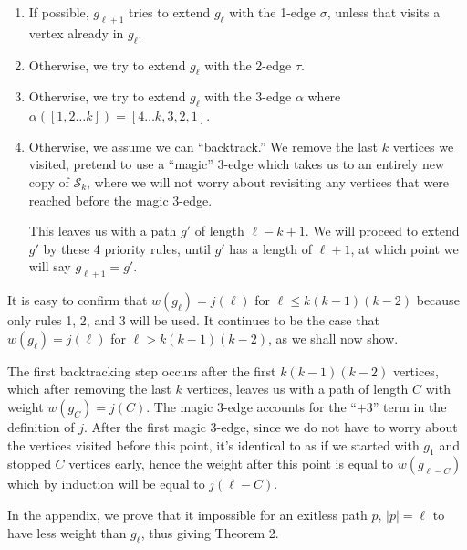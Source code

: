 \documentclass{article}
\newcommand{\hide}[1]{}
\newcommand{\edit}[1]{}%
\newcommand{\dc}[1]{}%
\begin{document}
\begin{enumerate}
    \item If possible, $g_{\ell+1}$ tries to extend $g_\ell$ with the 1-edge $\sigma$\dc{$\sigma$ of something, since $\sigma$ is a function}, unless that visits a vertex already in $g_\ell$.
    \item Otherwise, we try to extend $g_\ell$ with the 2-edge $\tau$\dc{ of something}\dc{ if doing so would not...}.
    \item Otherwise, we try to extend $g_\ell$ with the 3-edge $\alpha$\dc{ of something} where $\alpha([1,2\dots k]) = [4\dots k, 3,2,1]$\dc{ if doing so would not...}.
    \item Otherwise, we assume we can ``backtrack.'' We remove the last $k$ vertices we visited, pretend to use a ``magic'' 3-edge which takes us to an entirely new copy of $\mathcal{S}_k$, where we will not worry about revisiting any vertices that were reached before the magic 3-edge. 
    
    This leaves us with a path $g'$ of length $\ell-k+1$. We will proceed to extend $g'$ by these 4 priority rules, until $g'$ has a length of $\ell+1$, at which point we will say $g_{\ell+1} = g'$.
\end{enumerate} 

It is easy to confirm that $w(g_\ell)= j(\ell)$ for $\ell \leq k(k-1)(k-2)$ because only rules 1, 2, and 3  will be used. It continues to be the case that $w(g_{\ell}) = j(\ell)$ for $\ell > k(k-1)(k-2)$, as we shall now show.

\vspace{1.75em}
The first backtracking step occurs after the first $k(k-1)(k-2)$ vertices, which after removing the last $k$ vertices, leaves us with a path of length $C$ with weight $w(g_C) = j(C)$. The magic 3-edge accounts for the ``$+3$'' term in the definition of $j$. After the first magic 3-edge, since we do not have to worry about the vertices visited before this point, it's identical to as if we started with $g_1$ and stopped $C$ vertices early, hence the weight after this point is equal to $w(g_{\ell-C})$ which by induction will be equal to $j(\ell-C)$.

\vspace{1.75em}
In the appendix,\edit{ ref} we prove that it impossible for an exitless path $p,\,|p| = \ell$ to have less weight than $g_\ell$, thus giving Theorem 2\edit{ ref}.
\hide{
We may simplify the second case by noting that $j(C) +3 = C +C/k + (C+k)/k(k-1)$. Thus, with $q = \lceil (\ell-k(k-1)(k-2))/C\rceil$, we have
\[
    j(\ell-C) + j(C)+3 = \ell + \left\lceil \frac{\ell}{k}\right\rceil + \left\lceil \frac{\ell+qk}{k(k-1)}\right\rceil -3\]
. We letting $f_2,f_3$ be what is added to the 2nd/3rd term when the ceiling is taken, we have:

\[j(\ell) = \ell\left(1+ \frac{1}{k} + \frac{1}{k(k-1)}\right) + f_2+f_3-3\]}
\end{document}
